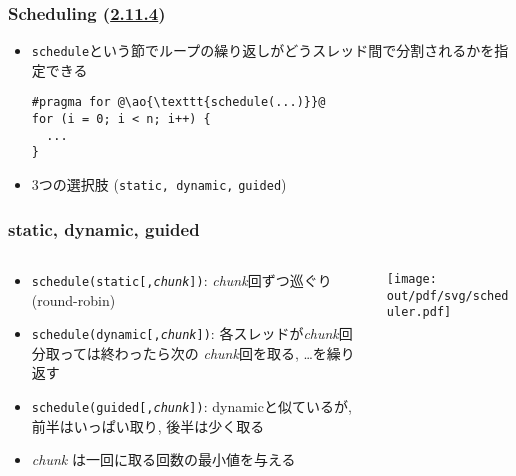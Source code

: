 \documentclass[10pt,dvipdfmx]{beamer}
\newcommand{\sectionompfor}{\href{https://www.openmp.org/spec-html/5.1/openmpsu48.html}{2.11.4}}
\newcommand{\ao}[1]{{\color{blue}#1}}
\begin{document}
\begin{frame}[fragile]
\frametitle{Scheduling (\sectionompfor)}
\begin{itemize}
\item \ao{\tt schedule}という節でループの繰り返しがどうスレッド間で分割されるかを指定できる
\begin{lstlisting}
#pragma for @\ao{\texttt{schedule(...)}}@
for (i = 0; i < n; i++) {
  ...
}
\end{lstlisting}
  
\item 3つの選択肢
  (\ao{\tt static, dynamic,} \ao{\tt guided})

\end{itemize}
\end{frame}

\begin{frame}
\frametitle{static, dynamic, guided}
\begin{columns}
  \begin{column}{0.53\textwidth}
\begin{itemize}
\item {\tt schedule(\ao{static{\rm [,{\em chunk}]}})}: 
  {\em chunk}回ずつ巡ぐり(round-robin)
\item {\tt schedule(\ao{dynamic{\rm [,{\em chunk}]}})}:
  各スレッドが{\em chunk}回分取っては終わったら次の
  {\em chunk}回を取る, \ldots を繰り返す
\item {\tt schedule(\ao{guided{\rm [,{\em chunk}]}})}:
  dynamicと似ているが, 前半はいっぱい取り, 後半は少く取る

\item \ao{\em chunk} は一回に取る回数の最小値を与える
\end{itemize}
  \end{column}

  \begin{column}{0.47\textwidth}
\texttt{[image: out/pdf/svg/scheduler.pdf]}
  \end{column}
\end{columns}
\end{frame}
\end{document}
